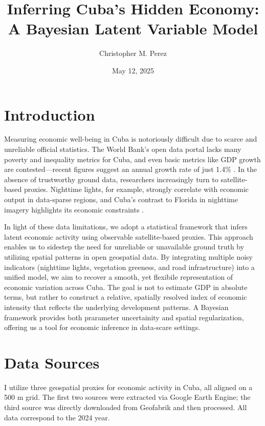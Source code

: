 \documentclass[12pt]{article}
\title{\textbf{Inferring Cuba's Hidden Economy: A Bayesian Latent Variable Model}}
\author{Christopher M. Perez}
\date{May 12, 2025}
\begin{document}
\maketitle
\tableofcontents
\newpage

\section{Introduction}
\label{sec:intro}

Measuring economic well-being in Cuba is notoriously difficult due to scarce and unreliable official statistics. The World Bank's open data portal lacks many poverty and inequality metrics for Cuba, and even basic metrics like GDP growth are contested---recent figures suggest an annual growth rate of just 1.4\% \parencite{worldbankcuba}. In the absence of trustworthy ground data, researchers increasingly turn to satellite-based proxies. Nighttime lights, for example, strongly correlate with economic output in data-sparse regions, and Cuba's contrast to  Florida in nighttime imagery highlights its economic constraints \parencite{steele2017poverty}.

In light of these data limitations, we adopt a statistical framework that infers latent economic activity using observable satellite-based proxies. This approach enables us to sidestep the need for unreliable or unavailable ground truth by utilizing spatial patterns in open geospatial data. By integrating multiple noisy indicators (nighttime lights, vegetation greeness, and road infrastructure) into a unified model, we aim to recover a smooth, yet flexibile representation of economic variation across Cuba. The goal is not to estimate GDP in absolute terms, but rather to construct a relative, spatially resolved index of economic intensity that reflects the underlying development patterns. A Bayesian framework provides both prarameter uncertainity and spatial regularization, offering us a tool for economic inference in data-scare settings. 

\section{Data Sources}

I utilize three geospatial proxies for economic activity in Cuba, all aligned on a 500 m grid. The first two sources were extracted via Google Earth Engine; the third source was directly downloaded from Geofabrik and then processed. All data correspond to the 2024 year.
\end{document}
